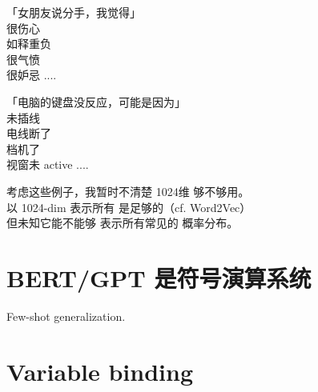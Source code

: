 「女朋友说分手，我觉得\underline{\hspace*{2cm}}」\\
\tab \textbullet 很伤心 \\
\tab \textbullet 如释重负 \\
\tab \textbullet 很气愤 \\
\tab \textbullet 很妒忌 ....

「电脑的键盘没反应，可能是因为\underline{\hspace*{2cm}}」\\
\tab \textbullet 未插线 \\
\tab \textbullet 电线断了 \\
\tab \textbullet 档机了 \\
\tab \textbullet 视窗未 active ....

考虑这些例子，我暂时不清楚 1024维 够不够用。 \\
以 1024-dim 表示所有  是足够的（cf. Word2Vec） \\
但未知它能不能够 表示所有常见的  概率分布。

\section{BERT/GPT 是符号演算系统}

Few-shot generalization.

\section{Variable binding}

